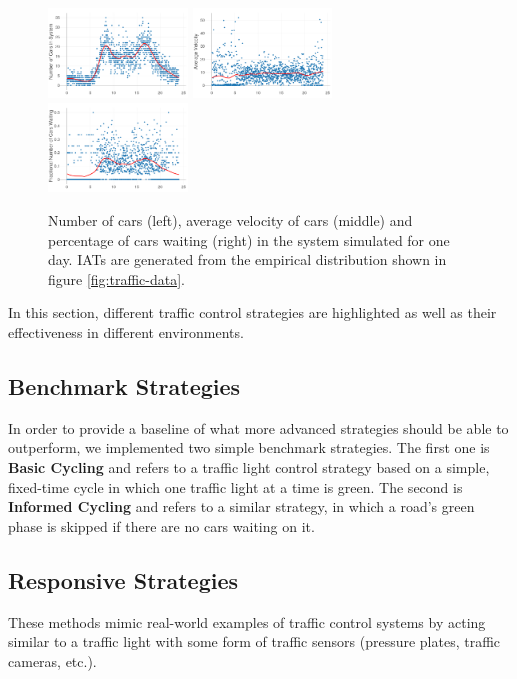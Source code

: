 \documentclass[11pt]{article}
\begin{document}
\begin{figure}[htb]
	\includegraphics[width=0.33\textwidth]{img/number_of_cars_over_day.png}
	\includegraphics[width=0.33\textwidth]{img/velocity_over_day.png}
	\includegraphics[width=0.33\textwidth]{img/frac_time_waitin.png}
	\caption{Number of cars (left), average velocity of cars (middle) and percentage of cars waiting (right) in the system simulated for one day. IATs are generated from the empirical distribution shown in figure \ref{fig:traffic-data}. \label{fig:validation}}
\end{figure}

\label{sec:strategies}
In this section, different traffic control strategies are highlighted as well as their effectiveness in different environments.

\subsection{Benchmark Strategies} 
In order to provide a baseline of what more advanced strategies should be able to outperform, we implemented two simple benchmark strategies. The first one is \textbf{Basic Cycling} and refers to a traffic light control strategy based on a simple, fixed-time cycle in which one traffic light at a time is green. The second is \textbf{Informed Cycling} and refers to a similar strategy, in which a road's green phase is skipped if there are no cars waiting on it.

\subsection{Responsive Strategies}
\label{sec:responsive}
These methods mimic real-world examples of traffic control systems by acting similar to a traffic light with some form of traffic sensors (pressure plates, traffic cameras, etc.). 
\end{document}

